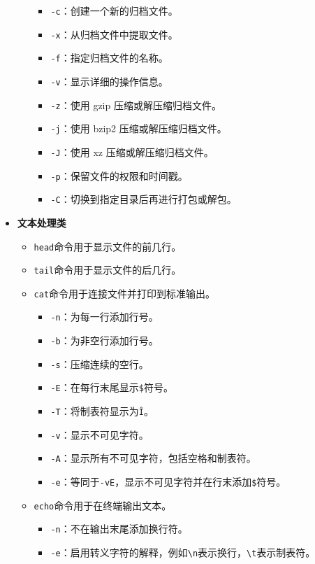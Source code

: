 \documentclass[../main.tex]{subfiles}
\begin{document}
\begin{itemize}
\begin{itemize}
\begin{itemize}
          \item \texttt{-c}：创建一个新的归档文件。
          \item \texttt{-x}：从归档文件中提取文件。
          \item \texttt{-f}：指定归档文件的名称。
          \item \texttt{-v}：显示详细的操作信息。
          \item \texttt{-z}：使用 gzip 压缩或解压缩归档文件。
          \item \texttt{-j}：使用 bzip2 压缩或解压缩归档文件。
          \item \texttt{-J}：使用 xz 压缩或解压缩归档文件。
          \item \texttt{-p}：保留文件的权限和时间戳。
          \item \texttt{-C}：切换到指定目录后再进行打包或解包。
        \end{itemize}
    \end{itemize}
  \item \textbf{文本处理类}
    \begin{itemize}
      \item \texttt{head}命令用于显示文件的前几行。
      \item \texttt{tail}命令用于显示文件的后几行。
      \item \texttt{cat}命令用于连接文件并打印到标准输出。
        \begin{itemize}
          \item \texttt{-n}：为每一行添加行号。
          \item \texttt{-b}：为非空行添加行号。
          \item \texttt{-s}：压缩连续的空行。
          \item \texttt{-E}：在每行末尾显示\texttt{\$}符号。
          \item \texttt{-T}：将制表符显示为\texttt{\^I}。
          \item \texttt{-v}：显示不可见字符。
          \item \texttt{-A}：显示所有不可见字符，包括空格和制表符。
          \item \texttt{-e}：等同于\texttt{-vE}，显示不可见字符并在行末添加\texttt{\$}符号。
        \end{itemize}
      \item \texttt{echo}命令用于在终端输出文本。
        \begin{itemize}
          \item \texttt{-n}：不在输出末尾添加换行符。
          \item \texttt{-e}：启用转义字符的解释，例如\texttt{\textbackslash n}表示换行，\texttt{\textbackslash t}表示制表符。

\end{itemize}
\end{itemize}
\end{itemize}
\end{document}
